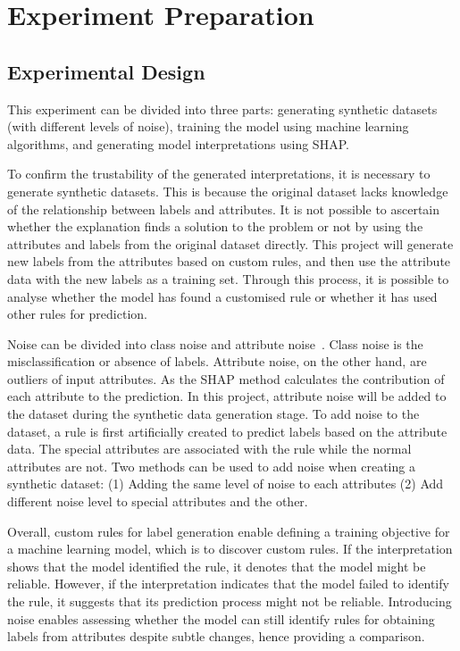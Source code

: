 \documentclass[runningheads,a4paper]{llncs}
\begin{document}
\section{Experiment Preparation}

\subsection{Experimental Design}
This experiment can be divided into three parts: generating synthetic datasets (with different levels of noise), training the model using machine learning algorithms, and generating model interpretations using SHAP.

To confirm the trustability of the generated interpretations, it is necessary to generate synthetic datasets. This is because the original dataset lacks knowledge of the relationship between labels and attributes. It is not possible to ascertain whether the explanation finds a solution to the problem or not by using the attributes and labels from the original dataset directly. This project will generate new labels from the attributes based on custom rules, and then use the attribute data with the new labels as a training set.
Through this process, it is possible to analyse whether the model has found a customised rule or whether it has used other rules for prediction.

Noise can be divided into class noise and attribute noise~\cite{Zhu2004}. 
Class noise is the misclassification or absence of labels.
Attribute noise, on the other hand, are outliers of input attributes.
As the SHAP method calculates the contribution of each attribute to the prediction.
In this project, attribute noise will be added to the dataset during the synthetic data generation stage.
To add noise to the dataset, a rule is first artificially created to predict labels based on the attribute data. The special attributes are associated with the rule while the normal attributes are not. Two methods can be used to add noise when creating a synthetic dataset: (1) Adding the same level of noise to each attributes (2) Add different noise level to special attributes and the other.

Overall, custom rules for label generation enable defining a training objective for a machine learning model, which is to discover custom rules. If the interpretation shows that the model identified the rule, it denotes that the model might be reliable. However, if the interpretation indicates that the model failed to identify the rule, it suggests that its prediction process might not be reliable.
Introducing noise enables assessing whether the model can still identify rules for obtaining labels from attributes despite subtle changes, hence providing a comparison.
\end{document}
